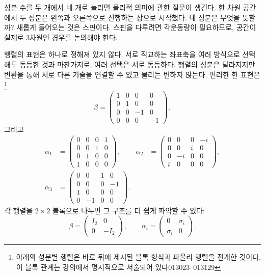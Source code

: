 성분 수를 두 개에서 네 개로 늘리면 물리적 의미에 관한 질문이 생긴다. 한 차원 공간에서 두 성분은 왼쪽과 오른쪽으로 진행하는 장으로 시작했다. 네 성분은 무엇을 뜻할까? 새롭게 들어오는 것은 스핀이다. 스핀을 다루려면 각운동량이 필요하므로, 공간이 실제로 3차원인 경우를 논의해야 한다.

행렬의 표현은 하나로 정해져 있지 않다. 서로 직교하는 좌표축을 여러 방식으로 선택해도 동등한 것과 마찬가지로, 여러 선택은 서로 동등하다. 행렬의 성분은 달라지지만 변환을 통해 서로 다른 기술을 연결할 수 있고 물리는 변하지 않는다. 편리한 한 표현은\footnote{아래의 성분별 행렬은 바로 뒤에 제시된 블록 형식과 파울리 행렬을 전개한 것이다. 이 블록 관계는 강의에서 명시적으로 서술되어 있다013023--013129}
\begin{equation}
\beta=
\begin{pmatrix}
1&0&0&0\\
0&1&0&0\\
0&0&-1&0\\
0&0&0&-1
\end{pmatrix},
\end{equation}
그리고
\begin{align}
\alpha_1&=
\begin{pmatrix}
0&0&0&1\\
0&0&1&0\\
0&1&0&0\\
1&0&0&0
\end{pmatrix},
&
\alpha_2&=
\begin{pmatrix}
0&0&0&-i\\
0&0&i&0\\
0&-i&0&0\\
i&0&0&0
\end{pmatrix},
\\[1ex]
\alpha_3&=
\begin{pmatrix}
0&0&1&0\\
0&0&0&-1\\
1&0&0&0\\
0&-1&0&0
\end{pmatrix}.
\end{align}
각 행렬을 \(2\times2\) 블록으로 나누면 그 구조를 더 쉽게 파악할 수 있다:
\begin{equation}
\beta=
\begin{pmatrix}
I_2&0\\
0&-I_2
\end{pmatrix},
\qquad
\alpha_i=
\begin{pmatrix}
0&\sigma_i\\
\sigma_i&0
\end{pmatrix}.
\end{equation}
